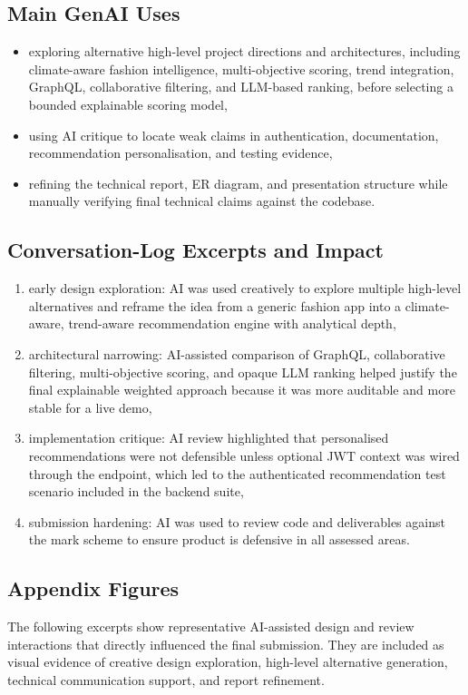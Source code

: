 \documentclass[11pt,a4paper]{article}
\begin{document}
\subsection*{Main GenAI Uses}
\begin{itemize}[itemsep=1pt, topsep=2pt]
  \item exploring alternative high-level project directions and architectures, including climate-aware fashion intelligence, multi-objective scoring, trend integration, GraphQL, collaborative filtering, and LLM-based ranking, before selecting a bounded explainable scoring model,
  \item using AI critique to locate weak claims in authentication, documentation, recommendation personalisation, and testing evidence,
  \item refining the technical report, ER diagram, and presentation structure while manually verifying final technical claims against the codebase.
\end{itemize}

\subsection*{Conversation-Log Excerpts and Impact}
\begin{enumerate}[itemsep=1pt, topsep=2pt]
  \item early design exploration: AI was used creatively to explore multiple high-level alternatives and reframe the idea from a generic fashion app into a climate-aware, trend-aware recommendation engine with analytical depth,
  \item architectural narrowing: AI-assisted comparison of GraphQL, collaborative filtering, multi-objective scoring, and opaque LLM ranking helped justify the final explainable weighted approach because it was more auditable and more stable for a live demo,
  \item implementation critique: AI review highlighted that personalised recommendations were not defensible unless optional JWT context was wired through the endpoint, which led to the authenticated recommendation test scenario included in the backend suite,
  \item submission hardening: AI was used to review code and deliverables against the mark scheme to ensure product is defensive in all assessed areas.
\end{enumerate}

\subsection*{Appendix Figures}
The following excerpts show representative AI-assisted design and review interactions that directly influenced the final submission. They are included as visual evidence of creative design exploration, high-level alternative generation, technical communication support, and report refinement.
\end{document}
